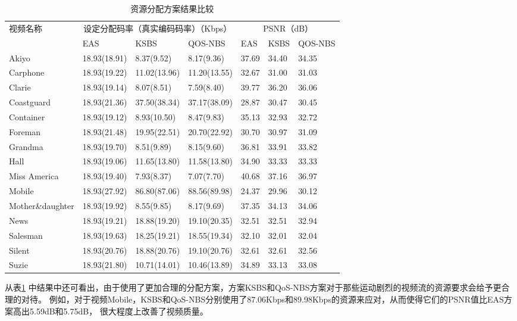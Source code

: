 \begin{table}[tb]
    \wuhao
    \centering
    \caption{资源分配方案结果比较}
    \begin{tabular*}{\textwidth}{p{3cm}llp{2.5cm}lll}
    \toprule
    视频名称 & \multicolumn{3}{c}{设定分配码率（真实编码码率）（Kbps）} &  \multicolumn{3}{c}{PSNR（dB）} \\
    \cmidrule{2-7}
             &  EAS & KSBS & QOS-NBS&  EAS & KSBS & QOS-NBS \\
    \midrule
Akiyo                & 18.93(18.91)& 8.37(9.52)&8.17(9.36)  &37.69  &34.40  &34.35 \\ 
Carphone             & 18.93(19.22)& 11.02(13.96)&11.20(13.55)  &32.67  &31.00  &31.03 \\ 
Clarie               & 18.93(19.14)& 8.07(8.51)&7.59(8.40)  &39.77  &36.20  &36.06 \\ 
Coastguard           & 18.93(21.36)& 37.50(38.34)&37.17(38.09)  &28.87  &30.47  &30.45 \\ 
Container            & 18.93(19.12)& 8.93(10.50)&8.47(9.83)  &35.13  &32.93  &32.72 \\ 
Foreman              & 18.93(21.48)& 19.95(22.51)&20.70(22.92)  &30.70  &30.97  &31.09 \\ 
Grandma              & 18.93(19.70)& 8.51(9.89)&8.15(9.60)  &36.81  &33.91  &33.82 \\ 
Hall                 & 18.93(19.06)& 11.65(13.80)&11.58(13.80)  &34.90  &33.33  &33.33 \\ 
Miss America         & 18.93(19.40)& 7.93(8.37)&7.07(7.70)  &40.68  &37.16  &36.97 \\ 
Mobile               & 18.93(27.92)& 86.80(87.06)&88.56(89.98)  &24.37  &29.96  &30.12 \\ 
Mother\&daughter     & 18.93(19.92)& 8.55(9.85)&8.17(9.69)  &37.35  &34.13  &34.06 \\ 
News                 & 18.93(19.21)& 18.88(19.20)&19.10(20.35)  &32.51  &32.51  &32.94 \\ 
Salesman             & 18.93(19.63)& 18.25(19.21)&18.55(19.34)  &32.10  &32.01  &32.04 \\ 
Silent               & 18.93(20.76)& 18.88(20.76)&19.10(20.76)  &32.61  &32.61  &32.56 \\ 
Suzie                & 18.93(21.80)& 10.71(14.01)&10.46(13.89)  &34.89  &33.13  &33.08 \\ 
\bottomrule
    \end{tabular*}
    \label{tab:chap_nash:resource_allocation_comparision}
\end{table}
从表\ref{tab:chap_nash:resource_allocation_comparision} 中结果中还可看出，由于使用了更加合理的分配方案，方案KSBS和QoS-NBS方案对于那些运动剧烈的视频流的资源要求会给予更合理的对待。
例如，对于视频Mobile，KSBS和QoS-NBS分别使用了87.06Kbps和89.98Kbps的资源来应对，从而使得它们的PSNR值比EAS方案高出5.59dB和5.75dB，
很大程度上改善了视频质量。

